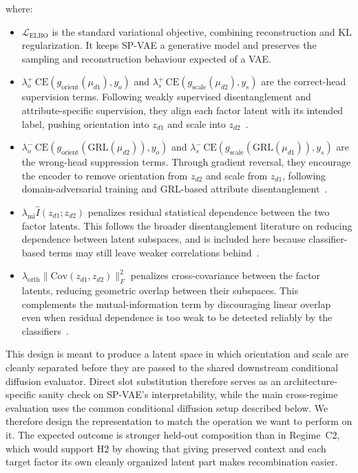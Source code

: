 where:
\begin{itemize}
    \item \(\mathcal{L}_{\mathrm{ELBO}}\) is the standard variational objective, combining
    reconstruction and KL regularization. It keeps SP-VAE a generative model and preserves the
    sampling and reconstruction behaviour expected of a VAE.

    \item \(\lambda^{+}_{o}\,\mathrm{CE}(g_{\mathrm{orient}}(\mu_{d1}), y_o)\) and
    \(\lambda^{+}_{s}\,\mathrm{CE}(g_{\mathrm{scale}}(\mu_{d2}), y_s)\) are the correct-head
    supervision terms. Following weakly supervised disentanglement and attribute-specific
    supervision, they align each factor latent with its intended label, pushing orientation into
    \(z_{d1}\) and scale into \(z_{d2}\)~\citep{weakly_supervised_disentanglement,
    attribute_disentanglement}.

    \item \(\lambda^{-}_{o}\,\mathrm{CE}(g_{\mathrm{orient}}(\mathrm{GRL}(\mu_{d2})), y_o)\) and
    \(\lambda^{-}_{s}\,\mathrm{CE}(g_{\mathrm{scale}}(\mathrm{GRL}(\mu_{d1})), y_s)\) are the
    wrong-head suppression terms. Through gradient reversal, they encourage the encoder to remove
    orientation from \(z_{d2}\) and scale from \(z_{d1}\), following domain-adversarial training and
    GRL-based attribute disentanglement~\citep{ganin2015unsupervised, ganin2016domain,
    attribute_disentanglement}.

    \item \(\lambda_{\mathrm{mi}} \hat{I}(z_{d1}; z_{d2})\) penalizes residual statistical
    dependence between the two factor latents. This follows the broader disentanglement literature on
    reducing dependence between latent subspaces, and is included here because classifier-based terms
    may still leave weaker correlations behind~\citep{disentangling_by_factorising,
    funke2022disentanglement}.

    \item \(\lambda_{\mathrm{orth}} \lVert \mathrm{Cov}(z_{d1}, z_{d2}) \rVert_F^2\) penalizes
    cross-covariance between the factor latents, reducing geometric overlap between their subspaces.
    This complements the mutual-information term by discouraging linear overlap even when residual
    dependence is too weak to be detected reliably by the classifiers~\citep{disentengaled_representation_learning}.
\end{itemize}

This design is meant to produce a latent space in which orientation and scale are cleanly separated
before they are passed to the shared downstream conditional diffusion evaluator. Direct slot
substitution therefore serves as an architecture-specific sanity check on SP-VAE's interpretability,
while the main cross-regime evaluation uses the common conditional diffusion setup described below.
We therefore design the representation to match the operation
we want to perform on it. The expected outcome is stronger held-out composition than in Regime~C2,
which would support H2 by showing that giving preserved context and each target factor its own
cleanly organized latent part makes recombination easier.

